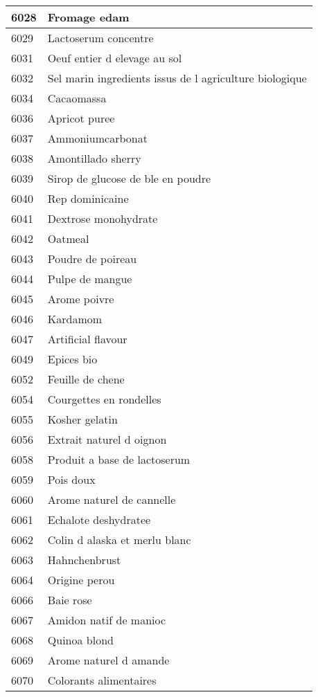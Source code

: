 \begin{longtable}{|l|l|}
6028 & Fromage edam \\ \hline 
6029 & Lactoserum concentre \\ \hline 
6031 & Oeuf entier d elevage au sol \\ \hline 
6032 & Sel marin ingredients issus de l agriculture biologique \\ \hline 
6034 & Cacaomassa \\ \hline 
6036 & Apricot puree \\ \hline 
6037 & Ammoniumcarbonat \\ \hline 
6038 & Amontillado sherry \\ \hline 
6039 & Sirop de glucose de ble en poudre \\ \hline 
6040 & Rep dominicaine \\ \hline 
6041 & Dextrose monohydrate \\ \hline 
6042 & Oatmeal \\ \hline 
6043 & Poudre de poireau \\ \hline 
6044 & Pulpe de mangue \\ \hline 
6045 & Arome poivre \\ \hline 
6046 & Kardamom \\ \hline 
6047 & Artificial flavour \\ \hline 
6049 & Epices bio \\ \hline 
6052 & Feuille de chene \\ \hline 
6054 & Courgettes en rondelles \\ \hline 
6055 & Kosher gelatin \\ \hline 
6056 & Extrait naturel d oignon \\ \hline 
6058 & Produit a base de lactoserum \\ \hline 
6059 & Pois doux \\ \hline 
6060 & Arome naturel de cannelle \\ \hline 
6061 & Echalote deshydratee \\ \hline 
6062 & Colin d alaska et merlu blanc \\ \hline 
6063 & Hahnchenbrust \\ \hline 
6064 & Origine perou \\ \hline 
6066 & Baie rose \\ \hline 
6067 & Amidon natif de manioc \\ \hline 
6068 & Quinoa blond \\ \hline 
6069 & Arome naturel d amande \\ \hline 
6070 & Colorants alimentaires \\ \hline 

\end{longtable}
